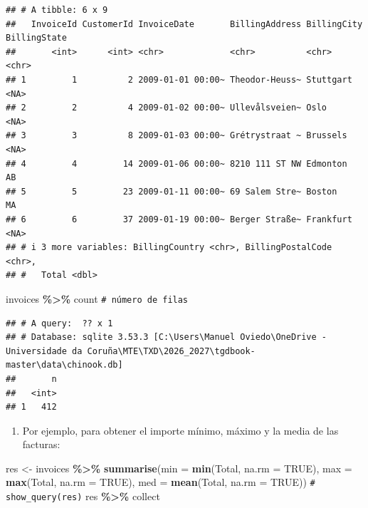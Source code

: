 \documentclass[
]{book}
\newenvironment{Shaded}{\begin{snugshade}}{\end{snugshade}}
\newcommand{\AttributeTok}[1]{\textcolor[rgb]{0.13,0.29,0.53}{#1}}
\newcommand{\CommentTok}[1]{\textcolor[rgb]{0.56,0.35,0.01}{\textit{#1}}}
\newcommand{\ConstantTok}[1]{\textcolor[rgb]{0.56,0.35,0.01}{#1}}
\newcommand{\FunctionTok}[1]{\textcolor[rgb]{0.13,0.29,0.53}{\textbf{#1}}}
\newcommand{\NormalTok}[1]{#1}
\newcommand{\OtherTok}[1]{\textcolor[rgb]{0.56,0.35,0.01}{#1}}
\newcommand{\SpecialCharTok}[1]{\textcolor[rgb]{0.81,0.36,0.00}{\textbf{#1}}}
\providecommand{\tightlist}{%
  \setlength{\itemsep}{0pt}\setlength{\parskip}{0pt}}
\theoremstyle{break}
\theoremstyle{nonumberplain}
\renewcommand{\CommentTok}[1]{\textcolor[rgb]{0.41,0.41,0.41}{\texttt{#1}}}
\begin{document}
\begin{verbatim}
## # A tibble: 6 x 9
##   InvoiceId CustomerId InvoiceDate       BillingAddress BillingCity BillingState
##       <int>      <int> <chr>             <chr>          <chr>       <chr>       
## 1         1          2 2009-01-01 00:00~ Theodor-Heuss~ Stuttgart   <NA>        
## 2         2          4 2009-01-02 00:00~ Ullevålsveien~ Oslo        <NA>        
## 3         3          8 2009-01-03 00:00~ Grétrystraat ~ Brussels    <NA>        
## 4         4         14 2009-01-06 00:00~ 8210 111 ST NW Edmonton    AB          
## 5         5         23 2009-01-11 00:00~ 69 Salem Stre~ Boston      MA          
## 6         6         37 2009-01-19 00:00~ Berger Straße~ Frankfurt   <NA>        
## # i 3 more variables: BillingCountry <chr>, BillingPostalCode <chr>,
## #   Total <dbl>
\end{verbatim}

\begin{Shaded}
\begin{Highlighting}[]
\NormalTok{invoices }\SpecialCharTok{\%\textgreater{}\%}\NormalTok{ count }\CommentTok{\# número de filas}
\end{Highlighting}
\end{Shaded}

\begin{verbatim}
## # A query:  ?? x 1
## # Database: sqlite 3.53.3 [C:\Users\Manuel Oviedo\OneDrive - Universidade da Coruña\MTE\TXD\2026_2027\tgdbook-master\data\chinook.db]
##       n
##   <int>
## 1   412
\end{verbatim}

\begin{enumerate}
\def\labelenumi{\arabic{enumi}.}
\setcounter{enumi}{1}
\tightlist
\item
  Por ejemplo, para obtener el importe mínimo, máximo y la media de las facturas:
\end{enumerate}

\begin{Shaded}
\begin{Highlighting}[]
\NormalTok{res }\OtherTok{\textless{}{-}}\NormalTok{ invoices }\SpecialCharTok{\%\textgreater{}\%} \FunctionTok{summarise}\NormalTok{(}\AttributeTok{min =} \FunctionTok{min}\NormalTok{(Total, }\AttributeTok{na.rm =} \ConstantTok{TRUE}\NormalTok{), }
                        \AttributeTok{max =} \FunctionTok{max}\NormalTok{(Total, }\AttributeTok{na.rm =} \ConstantTok{TRUE}\NormalTok{), }
                        \AttributeTok{med =} \FunctionTok{mean}\NormalTok{(Total, }\AttributeTok{na.rm =} \ConstantTok{TRUE}\NormalTok{))}
\CommentTok{\# show\_query(res)}
\NormalTok{res  }\SpecialCharTok{\%\textgreater{}\%}\NormalTok{ collect}
\end{Highlighting}
\end{Shaded}
\end{document}
